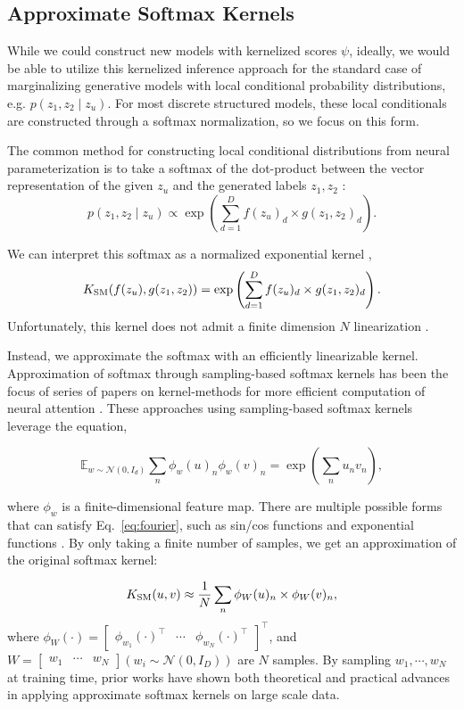 \documentclass{article}
\begin{document}
\subsection{Approximate Softmax Kernels}

While we could construct new models with kernelized scores $\psi$, ideally, we would be able to utilize this kernelized inference approach for the standard case of marginalizing generative models with local conditional
probability distributions, e.g. $p(z_1, z_2 \mid z_{u})$.  For most discrete structured models, these local conditionals are
constructed through a softmax normalization, so we focus on this form.

The common method for constructing local conditional distributions from neural parameterization is to take a softmax of the dot-product between the vector representation of the given $z_u$ and the generated labels $z_1,z_2$ \cite{he2017efficient}:
\[ p(z_1, z_2 \mid z_{u}) \propto \exp \left(\sum_{d=1}^D f(z_u)_d \times g(z_1, z_2)_d \right).\] 

We can interpret this softmax as a normalized exponential kernel \citep{tsai2019kernelattn},
\[  K_{\mathrm{SM}}(f(z_u), g(z_1, z_2)) = \exp \left(\sum_{d=1}^D f(z_u)_d \times g(z_1, z_2)_d \right).  \] 
Unfortunately, this kernel does not admit a finite dimension $N$ linearization \citep{steinwart2006explicit}. 

Instead, we approximate the softmax with an efficiently linearizable kernel. Approximation of softmax through sampling-based softmax kernels has been the focus of series of papers on
kernel-methods for more efficient computation of neural attention
\citep{choromanski2020performer,katharopoulos2020lineartransformer,peng2021rfa,shen2018linearattn}. These approaches using sampling-based softmax kernels leverage the equation,

\begin{equation}
\label{eq:fourier}
    \mathbb{E}_{w\sim \mathcal{N}(0, I_d)} \sum_n \phi_{w} (u)_n \phi_w(v)_n  = \exp\left(\sum_n u_n  v_n\right),
\end{equation}

where $\phi_{w}$ is a finite-dimensional feature map. There are multiple possible forms that can satisfy Eq.~\ref{eq:fourier}, such as sin/cos functions \cite{rahimi2007rff,rawat2019sampledsoftmax} and exponential functions \citep{choromanski2020performer}. By only taking a finite number of samples, we get an approximation of the original softmax kernel:

\begin{equation*}
    K_{\mathrm{SM}}(u, v) \approx \frac{1}{N} \sum_n \phi_W(u)_n \times \phi_W(v)_n,
\end{equation*}
where $\phi_W(\cdot) = \begin{bmatrix}\phi_{w_1} (\cdot)^\top &\cdots &\phi_{w_N}(\cdot)^\top \end{bmatrix}^\top$, and $W=\begin{bmatrix}w_1 & \cdots & w_N \end{bmatrix} (w_i \sim \mathcal{N}(0, I_D))$ are $N$ samples.  By sampling $w_1, \cdots, w_N$ at training time, prior works have shown both theoretical and practical advances in
applying approximate softmax kernels on large scale data. 
\end{document}
